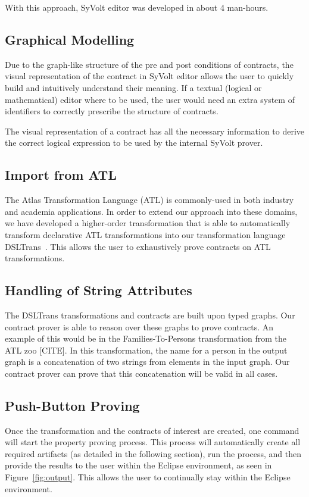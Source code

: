 With this approach, SyVolt editor was developed in about 4 man-hours.

\subsection{Graphical Modelling}

Due to the graph-like structure of the pre and post conditions of contracts, the
visual representation of the contract in SyVolt editor allows the user to
quickly build and intuitively understand their meaning.
If a textual (logical or mathematical) editor where to be used, the user would
need an extra system of identifiers to correctly prescribe the structure of contracts.

The visual representation of a contract has all the necessary information to derive the correct 
logical expression to be used by the internal SyVolt prover.

\subsection{Import from ATL}
The Atlas Transformation Language (ATL) is commonly-used in both industry and
academia applications. In order to extend our approach into these domains, we
have developed a higher-order transformation that is able to automatically
transform declarative ATL transformations into our transformation language
DSLTrans~\cite{Oakes}. This allows the user to exhaustively prove contracts on
ATL transformations.

\subsection{Handling of String Attributes}
The DSLTrans transformations and contracts are built upon typed graphs.
Our contract prover is able to reason over these graphs to prove contracts. An
example of this would be in the Families-To-Persons transformation from the ATL
zoo [CITE]. In this transformation, the name for a person in the output graph is
a concatenation of two strings from elements in the input graph. Our contract
prover can prove that this concatenation will be valid in all cases.

\subsection{Push-Button Proving}
Once the transformation and the contracts of interest are created, one command
will start the property proving process. This process will automatically create
all required artifacts (as detailed in the following section), run the process,
and then provide the results to the user within the Eclipse environment, as seen
in Figure~\ref{fig:output}. This allows the user to continually stay within the
Eclipse environment.

